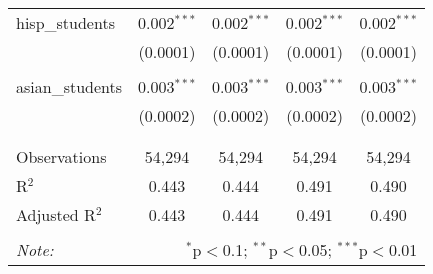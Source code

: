 \begin{table}[!htbp]
\begin{tabular}{@{\extracolsep{-2pt}}lcccc}
 hisp\_students & 0.002$^{***}$ & 0.002$^{***}$ & 0.002$^{***}$ & 0.002$^{***}$ \\ 
  & (0.0001) & (0.0001) & (0.0001) & (0.0001) \\ 
  & & & & \\ 
 asian\_students & 0.003$^{***}$ & 0.003$^{***}$ & 0.003$^{***}$ & 0.003$^{***}$ \\ 
  & (0.0002) & (0.0002) & (0.0002) & (0.0002) \\ 
  & & & & \\ 
\hline \\[-1.8ex] 
Observations & 54,294 & 54,294 & 54,294 & 54,294 \\ 
R$^{2}$ & 0.443 & 0.444 & 0.491 & 0.490 \\ 
Adjusted R$^{2}$ & 0.443 & 0.444 & 0.491 & 0.490 \\ 
\hline 
\hline \\[-1.8ex] 
\textit{Note:}  & \multicolumn{4}{r}{$^{*}$p$<$0.1; $^{**}$p$<$0.05; $^{***}$p$<$0.01} \\ 
\end{tabular} 
\end{table} 
